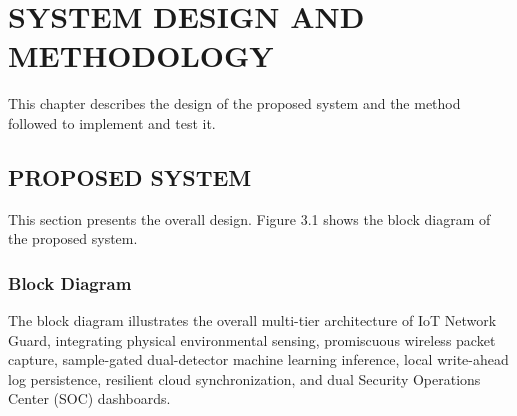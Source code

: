 \documentclass[11pt,a4paper]{report}
\begin{document}
\clearpage

\chapter{SYSTEM DESIGN AND METHODOLOGY}
This chapter describes the design of the proposed system and the method followed to implement and test it.

\section{PROPOSED SYSTEM}
This section presents the overall design. Figure 3.1 shows the block diagram of the proposed system.

\subsection{Block Diagram}
The block diagram illustrates the overall multi-tier architecture of IoT Network Guard, integrating physical environmental sensing, promiscuous wireless packet capture, sample-gated dual-detector machine learning inference, local write-ahead log persistence, resilient cloud synchronization, and dual Security Operations Center (SOC) dashboards.
\end{document}
